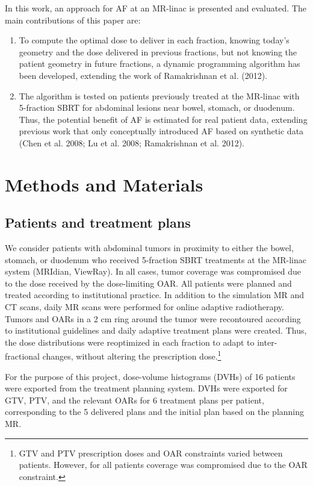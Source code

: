 \documentclass[11pt]{article}
\begin{document}
In this work, an approach for AF at an MR-linac is presented and evaluated. The main contributions of this paper are:

\begin{enumerate}
\item To compute the optimal dose to deliver in each fraction, knowing today's geometry and the dose delivered in previous fractions, but not knowing the patient geometry in future fractions, a dynamic programming algorithm has been developed, extending the work of Ramakrishnan et al. (2012).
\item The algorithm is tested on patients previously treated at the MR-linac with 5-fraction SBRT for abdominal lesions near bowel, stomach, or duodenum. Thus, the potential benefit of AF is estimated for real patient data, extending previous work that only conceptually introduced AF based on synthetic data (Chen et al. 2008; Lu et al. 2008; Ramakrishnan et al. 2012).
\end{enumerate}

\section{Methods and Materials}

\subsection{Patients and treatment plans}

We consider patients with abdominal tumors in proximity to either the bowel, stomach, or duodenum who received 5-fraction SBRT treatments at the MR-linac system (MRIdian, ViewRay). In all cases, tumor coverage was compromised due to the dose received by the dose-limiting OAR. All patients were planned and treated according to institutional practice. In addition to the simulation MR and CT scans, daily MR scans were performed for online adaptive radiotherapy. Tumors and OARs in a 2 cm ring around the tumor were recontoured according to institutional guidelines and daily adaptive treatment plans were created. Thus, the dose distributions were reoptimized in each fraction to adapt to inter-fractional changes, without altering the prescription dose.\footnote{GTV and PTV prescription doses and OAR constraints varied between patients. However, for all patients coverage was compromised due to the OAR constraint.}

For the purpose of this project, dose-volume histograms (DVHs) of 16 patients were exported from the treatment planning system. DVHs were exported for GTV, PTV, and the relevant OARs for 6 treatment plans per patient, corresponding to the 5 delivered plans and the initial plan based on the planning MR.
\end{document}
